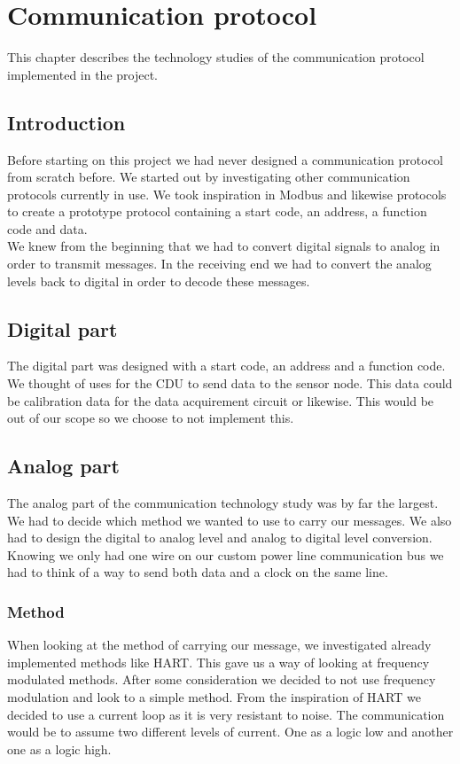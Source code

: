 \chapter{Communication protocol}
This chapter describes the technology studies of the communication protocol implemented in the project.
\section{Introduction}
Before starting on this project we had never designed a communication protocol from scratch before. We started out by investigating other communication protocols currently in use. We took inspiration in Modbus and likewise protocols to create a prototype protocol containing a start code, an address, a function code and data. \\
We knew from the beginning that we had to convert digital signals to analog in order to transmit messages. In the receiving end we had to convert the analog levels back to digital in order to decode these messages.\\
\section{Digital part}
The digital part was designed with a start code, an address and a function code. We thought of uses for the CDU to send data to the sensor node. This data could be calibration data for the data acquirement circuit or likewise. This would be out of our scope so we choose to not implement this. 
\section{Analog part}
The analog part of the communication technology study was by far the largest. We had to decide which method we wanted to use to carry our messages. We also had to design the digital to analog level and analog to digital level conversion. Knowing we only had one wire on our custom power line communication bus we had to think of a way to send both data and a clock on the same line.
\subsection{Method}
When looking at the method of carrying our message, we investigated already implemented methods like HART. This gave us a way of looking at frequency modulated methods. After some consideration we decided to not use frequency modulation and look to a simple method. From the inspiration of HART we decided to use a current loop as it is very resistant to noise. The communication would be to assume two different levels of current. One as a logic low and another one as a logic high.
